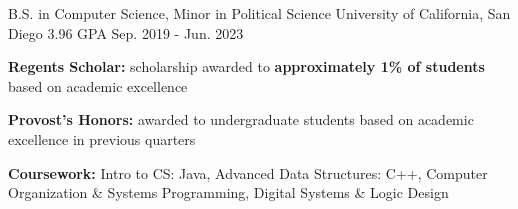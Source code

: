 

\begin{cventries}

    \cventry
    {B.S. in Computer Science, Minor in Political Science} %
    {University of California, San Diego} %
    {3.96 GPA} %
    {Sep. 2019 - Jun. 2023} %
    {
      \begin{cvitems} %
        \item {\textbf{Regents Scholar:} scholarship awarded to \textbf{approximately 1\% of students} based on academic excellence}
        \item {\textbf{Provost's Honors:} awarded to undergraduate students based on academic excellence in previous quarters}
        \item {\textbf{Coursework:} Intro to CS: Java, Advanced Data Structures: C++, Computer Organization \& Systems Programming, Digital Systems \& Logic Design}
      \end{cvitems}
    }

\end{cventries}
